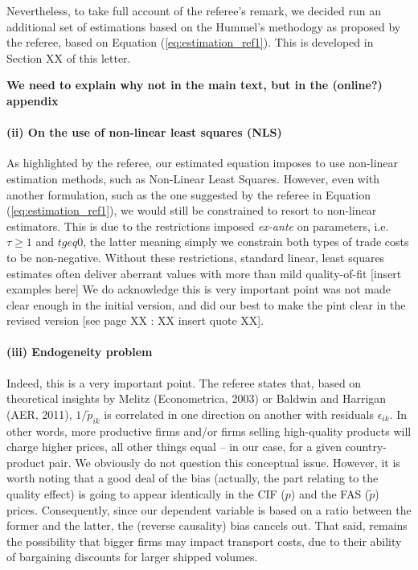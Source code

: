 \documentclass[a4paper,12pt]{article}
\begin{document}
Nevertheless, to take full account of the referee’s remark, we decided run an additional set of estimations based on the Hummel's methodogy as proposed by the referee, based on Equation (\ref{eq:estimation_ref1}). This is developed in Section XX of this letter.

\textbf{We need to explain why not in the main text, but in the (online?) appendix}

\paragraph{(ii) On the use of non-linear least squares (NLS)}
As highlighted by the referee, our estimated equation imposes to use non-linear estimation methods, such as Non-Linear Least Squares. However, even with another formulation, such as the one suggested by the referee in Equation (\ref{eq:estimation_ref1}), we would still be constrained to resort to non-linear estimators. This is due to the restrictions imposed \textit{ex-ante} on parameters, i.e. $\tau \geq 1$ and $t geq 0$, the latter meaning simply we constrain both types of trade costs to be non-negative. Without these restrictions, standard linear, least squares estimates often deliver aberrant values with more than mild quality-of-fit [insert examples here]
We do acknowledge this is very important point was not made clear enough in the initial version, and did our best to make the pint clear in the revised version [see page XX : XX insert quote XX].

\paragraph{(iii) Endogeneity problem}
Indeed, this is a very important point. The referee states that, based on theoretical insights by Melitz (Econometrica, 2003) or Baldwin and Harrigan (AER, 2011), $1/\tilde{p}_{ik}$ is correlated in one direction on another with residuals $\epsilon_{ik}$. In other words, more productive firms and/or firms selling high-quality products will charge higher prices, all other things equal – in our case, for a given country-product pair.
We obviously do not question this conceptual issue. However, it is worth noting that a good deal of the bias (actually, the part relating to the quality effect) is going to appear identically in the CIF ($p$) and the FAS ($\tilde{p}$) prices. Consequently, since our dependent variable is based on a ratio between the former and the latter, the (reverse causality) bias cancels out. That said, remains the possibility that bigger firms may impact transport costs, due to their ability of bargaining discounts for larger shipped volumes.
\end{document}
